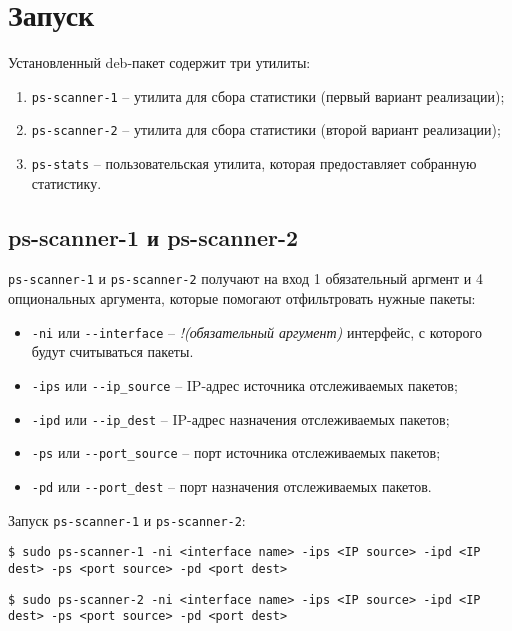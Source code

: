 \section{Запуск}
Установленный deb-пакет содержит три утилиты:
\begin{enumerate}
    \item \verb|ps-scanner-1| -- утилита для сбора статистики (первый вариант реализации);
    \item \verb|ps-scanner-2| -- утилита для сбора статистики (второй вариант реализации);
    \item \verb|ps-stats| -- пользовательская утилита, которая предоставляет собранную статистику.
\end{enumerate}

\subsection{ps-scanner-1 и ps-scanner-2}
\verb|ps-scanner-1| и \verb|ps-scanner-2| получают на вход 1 обязательный аргмент и 4 опциональных аргумента, которые помогают отфильтровать нужные пакеты:
\begin{itemize}
    \item \verb|-ni| или \verb|--interface| -- \footnotesize\textit{!(обязательный аргумент)}  интерфейс, с которого будут считываться пакеты.
    \item \verb|-ips| или \verb|--ip_source| -- IP-адрес источника отслеживаемых пакетов;
    \item \verb|-ipd| или \verb|--ip_dest| -- IP-адрес назначения отслеживаемых пакетов;
    \item \verb|-ps| или \verb|--port_source| -- порт источника отслеживаемых пакетов;
    \item \verb|-pd| или \verb|--port_dest| -- порт назначения отслеживаемых пакетов.
\end{itemize}

\linespace

Запуск \verb|ps-scanner-1| и \verb|ps-scanner-2|:
\begin{lstlisting}
$ sudo ps-scanner-1 -ni <interface name> -ips <IP source> -ipd <IP dest> -ps <port source> -pd <port dest>
\end{lstlisting}

\begin{lstlisting}
$ sudo ps-scanner-2 -ni <interface name> -ips <IP source> -ipd <IP dest> -ps <port source> -pd <port dest>
\end{lstlisting}

